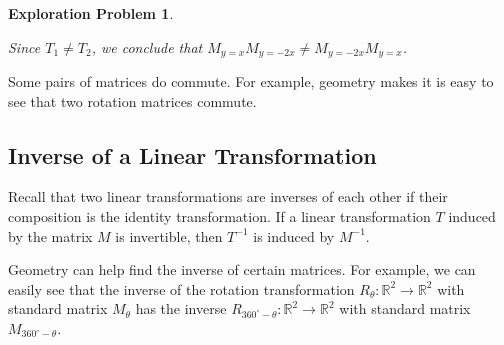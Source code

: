 \documentclass{ximera}
\newcommand{\RR}{\mathbb{R}}
\newtheorem{initprob}{Exploration Problem}
\begin{document}
\begin{initprob}
\begin{center}
\end{center}

Since $T_1\neq T_2$, we conclude that $M_{y=x}M_{y=-2x}\neq M_{y=-2x}M_{y=x}$.

\end{initprob}

\begin{example}\label{ex:rotationscommute}
Some pairs of matrices do commute.  For example, geometry makes it is easy to see that two rotation matrices commute.
\end{example}




 
\subsection*{Inverse of a Linear Transformation}
Recall that two linear transformations are inverses of each other if their composition is the identity transformation.
If a linear transformation $T$ induced by the matrix $M$ is invertible, then $T^{-1}$ is induced by $M^{-1}$.  

Geometry can help find the inverse of certain matrices.  For example, we can easily see that the inverse of the rotation transformation $R_{\theta}:\RR^2\rightarrow \RR^2$ with standard matrix $M_{\theta}$ has the inverse $R_{360^{\circ}-\theta}:\RR^2\rightarrow \RR^2$ with standard matrix $M_{360^{\circ}-\theta}$.
\end{document}
